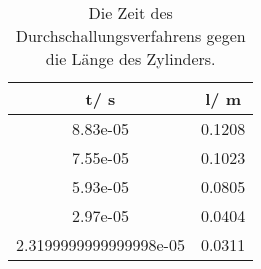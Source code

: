 \begin{table}\caption{Die Zeit des Durchschallungsverfahrens gegen die Länge des Zylinders.}
\label{tab2}
\centering
{}
\begin{tabular}{S[]S[]} 
\toprule
{t/ \si{\second}} & {l/ \si{\meter}}\\
\midrule
8.83e-05 & 0.1208\\
7.55e-05 & 0.1023\\
5.93e-05 & 0.0805\\
2.97e-05 & 0.0404\\
2.3199999999999998e-05 & 0.0311\\
\bottomrule
\end{tabular}\end{table}